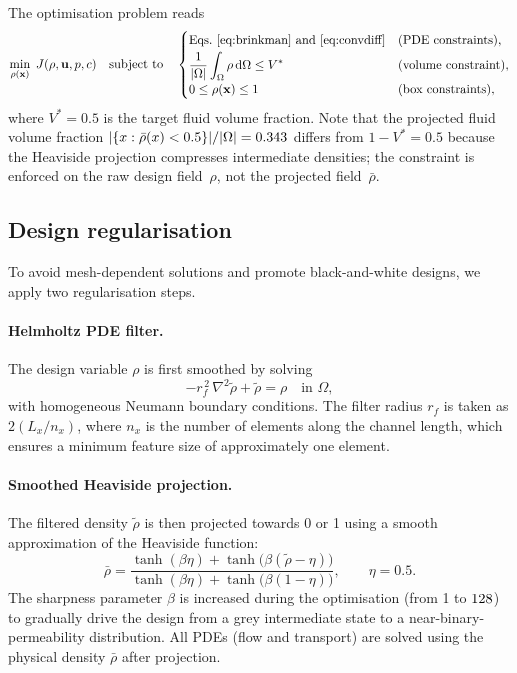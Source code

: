 The optimisation problem reads
\begin{equation}
    \min_{\rho(\mathbf{x})}\; J(\rho,\mathbf{u},p,c)
    \quad\text{subject to}\quad
    \begin{cases}
        \text{Eqs.~\eqref{eq:brinkman} and \eqref{eq:convdiff}} & \text{(PDE constraints)},\\[2pt]
        \displaystyle \frac{1}{|\Omega|}\int_\Omega \rho\,\mathrm{d}\Omega \le V^* & \text{(volume constraint)},\\[2pt]
        0 \le \rho(\mathbf{x}) \le 1 & \text{(box constraints)},
    \end{cases}
    \label{eq:opt}
\end{equation}
where \(V^* = 0.5\) is the target fluid volume fraction.
Note that the projected fluid volume fraction
$|\{x : \bar{\rho}(x) < 0.5\}|/|\Omega| = 0.343$
differs from $1 - V^* = 0.5$ because the Heaviside projection
compresses intermediate densities; the constraint is enforced
on the raw design field~$\rho$, not the projected field~$\bar\rho$.

\subsection{Design regularisation}
To avoid mesh-dependent solutions and promote black-and-white designs, we apply two regularisation steps.

\paragraph{Helmholtz PDE filter.}
The design variable \(\rho\) is first smoothed by solving
\begin{equation}
    -r_f^{\,2}\,\nabla^2 \tilde{\rho} + \tilde{\rho} = \rho \quad\text{in } \Omega,
    \label{eq:helmholtz}
\end{equation}
with homogeneous Neumann boundary conditions.
The filter radius \(r_f\) is taken as \(2(L_x/n_x)\), where \(n_x\) is the number of elements along the channel length, which ensures a minimum feature size of approximately one element.

\paragraph{Smoothed Heaviside projection.}
The filtered density \(\tilde{\rho}\) is then projected towards 0 or 1 using a smooth approximation of the Heaviside function:
\begin{equation}
    \bar{\rho} = \frac{\tanh(\beta\eta) + \tanh\!\bigl(\beta(\tilde{\rho} - \eta)\bigr)}
                    {\tanh(\beta\eta) + \tanh\!\bigl(\beta(1 - \eta)\bigr)},
    \qquad \eta = 0.5.
    \label{eq:heaviside}
\end{equation}
The sharpness parameter \(\beta\) is increased during the optimisation (from 1 to $128$) to gradually drive the design from a grey intermediate state to a near-binary-permeability distribution.
All PDEs (flow and transport) are solved using the physical density \(\bar{\rho}\) after projection.

